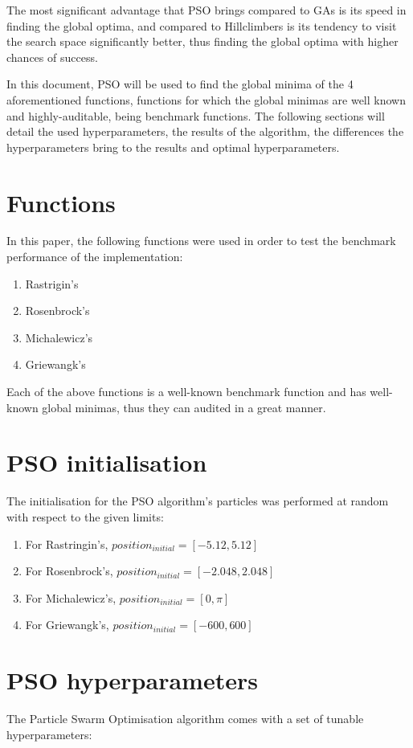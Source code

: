 \documentclass[conference]{IEEEtran}
\begin{document}
The most significant advantage that PSO brings compared to GAs is its speed in finding the global optima, and compared to Hillclimbers
is its tendency to visit the search space significantly better, thus finding the global optima with higher chances of success.

In this document, PSO will be used to find the global minima of the 4 aforementioned functions, functions for which the global
minimas are well known and highly-auditable, being benchmark functions. The following sections will detail the used hyperparameters,
the results of the algorithm, the differences the hyperparameters bring to the results and optimal hyperparameters.

\section{Functions}
In this paper, the following functions were used in order to test the benchmark performance of the implementation:

\begin{enumerate}
    \item Rastrigin's
    \item Rosenbrock's
    \item Michalewicz's
    \item Griewangk's
\end{enumerate}

Each of the above functions is a well-known benchmark function and has well-known global minimas, thus they can audited
in a great manner.

\section{PSO initialisation}
The initialisation for the PSO algorithm's particles was performed at random with respect to the given limits:

\begin{enumerate}
    \item For Rastringin's, $position_{initial} = [-5.12, 5.12]$
    \item For Rosenbrock's, $position_{initial} = [-2.048, 2.048]$
    \item For Michalewicz's, $position_{initial} = [0, \pi]$
    \item For Griewangk's, $position_{initial} = [-600, 600]$
\end{enumerate}

\section{PSO hyperparameters}
The Particle Swarm Optimisation algorithm comes with a set of tunable hyperparameters:
\end{document}
